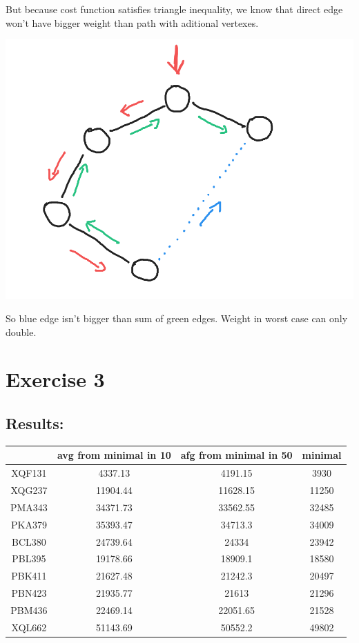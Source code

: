 \documentclass{article}
\begin{document}
But because cost function satisfies triangle inequality, we know that direct edge won't have bigger weight than path with aditional vertexes.
\begin{center}
    \includegraphics[scale=0.14]{3} 
\end{center}
So blue edge isn't bigger than sum of green edges. Weight in worst case can only double.

\section*{Exercise 3}
\subsection*{Results:}
\begin{center}
    \begin{tabular}{| c | c | c | c |}
        \hline
        & avg from minimal in 10 & afg from minimal in 50 & minimal\\ 
        \hline
        XQF131 & 4337.13 & 4191.15 & 3930\\
        \hline
        XQG237 & 11904.44 & 11628.15 & 11250\\
        \hline
        PMA343 & 34371.73 & 33562.55 & 32485\\
        \hline
        PKA379 & 35393.47 & 34713.3 & 34009\\
        \hline
        BCL380 & 24739.64 & 24334 & 23942\\
        \hline
        PBL395 & 19178.66 & 18909.1 & 18580\\
        \hline
        PBK411 & 21627.48 & 21242.3 & 20497\\
        \hline
        PBN423 & 21935.77 & 21613 & 21296\\
        \hline
        PBM436 & 22469.14 & 22051.65 & 21528\\
        \hline
        XQL662 & 51143.69 & 50552.2 & 49802\\
        \hline
    \end{tabular}
    \end{center}
\end{document}
